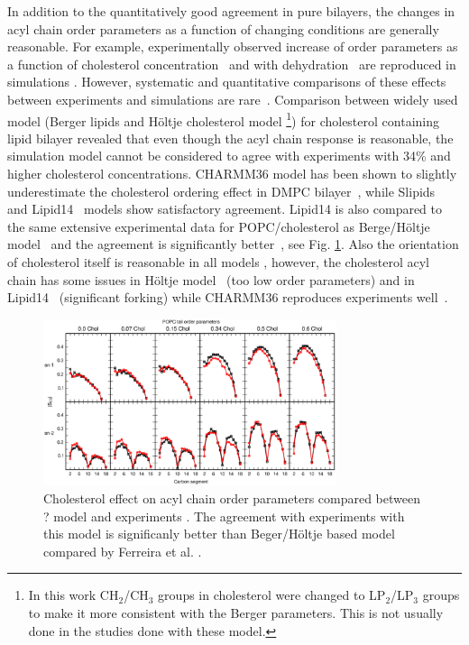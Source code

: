 \documentclass[aps,prl,superscriptaddress,twocolumn]{revtex4}
\begin{document}
In addition to the quantitatively good agreement in pure bilayers, the changes in 
acyl chain order parameters as a function of changing conditions are generally reasonable.
For example, experimentally observed increase of order parameters as a function of cholesterol 
concentration~\cite{dufourc84,lafleur90,douliez95,urbina95,vermeer07,ferreira13} and with dehydration~\cite{mallikarjunaiah11,dvinskikh05b} 
are reproduced in simulations \cite{mashl01,hogberg06,vermeer07,zhu07,lim12,ferreira13,jambeck13,madej15}. 
However, systematic and quantitative comparisons of these effects between experiments and simulations are rare~\cite{ferreira13,madej15}.
Comparison between widely used model (Berger lipids \cite{berger97} and H{\"o}ltje cholesterol model \cite{holtje01}
\footnote{In this work CH$_2$/CH$_3$ groups in cholesterol were changed to LP$_2$/LP$_3$ groups to make it more consistent with the Berger
parameters. This is not usually done in the studies done with these model.})
for cholesterol containing lipid bilayer revealed that even though the acyl chain response is reasonable,
the simulation model cannot be considered to agree with experiments with 34\% and higher cholesterol concentrations.
CHARMM36 model has been shown to slightly underestimate the cholesterol ordering effect in DMPC bilayer~\cite{lim12},
while Slipids~\cite{jambeck13} and Lipid14~\cite{madej15} models show satisfactory agreement. Lipid14 is also compared to the same
extensive experimental data for POPC/cholesterol as Berge/H{\"o}ltje model~\cite{ferreira13} and the agreement is 
significantly better~\cite{madej15}, see Fig. \ref{cholTAILmadej}. 
Also the orientation of cholesterol itself is reasonable in all models \cite{vermeer07,lim12,ferreira13,madej15}, however, the cholesterol
acyl chain has some issues in H{\"o}ltje model~\cite{ferreira13} (too low order parameters) and in Lipid14~\cite{madej15} (significant forking) while
CHARMM36 reproduces experiments well~\cite{lim12}. 
\begin{figure}[]
  \includegraphics[width=8.6cm]{../Fig/cholTAILmadej.eps}
\newline
  \caption{\label{cholTAILmadej}
    Cholesterol effect on acyl chain order parameters compared between ? model \cite{madej15} and experiments \cite{ferreira13}.
    The agreement with experiments with this model is significanly better than Beger/H{\"o}ltje based model compared by 
    Ferreira et al. \cite{ferreira13}.
  } 
\end{figure}
\end{document}
